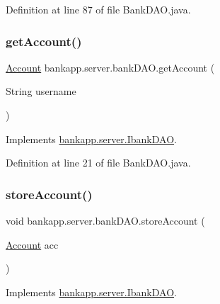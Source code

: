 Definition at line 87 of file Bank\+D\+A\+O.\+java.

\mbox{\label{classbankapp_1_1server_1_1bank_d_a_o_ad561ee843029636f739dbfad0bfb5414}} 
\subsubsection{\texorpdfstring{get\+Account()}{getAccount()}}
{\footnotesize\ttfamily \hyperlink{classbankapp_1_1server_1_1_account}{Account} bankapp.\+server.\+bank\+D\+A\+O.\+get\+Account (\begin{DoxyParamCaption}\item[{String}]{username }\end{DoxyParamCaption})}



Implements \hyperlink{interfacebankapp_1_1server_1_1_ibank_d_a_o_af0e84b74c8826ce5fb80a156bc19e488}{bankapp.\+server.\+Ibank\+D\+AO}.



Definition at line 21 of file Bank\+D\+A\+O.\+java.

\mbox{\label{classbankapp_1_1server_1_1bank_d_a_o_a0023f065d21c23dd9b952339fd832d7e}} 
\subsubsection{\texorpdfstring{store\+Account()}{storeAccount()}}
{\footnotesize\ttfamily void bankapp.\+server.\+bank\+D\+A\+O.\+store\+Account (\begin{DoxyParamCaption}\item[{\hyperlink{classbankapp_1_1server_1_1_account}{Account}}]{acc }\end{DoxyParamCaption})}



Implements \hyperlink{interfacebankapp_1_1server_1_1_ibank_d_a_o_a6631fb11c78a48b05a743e4f7f2757ef}{bankapp.\+server.\+Ibank\+D\+AO}.



